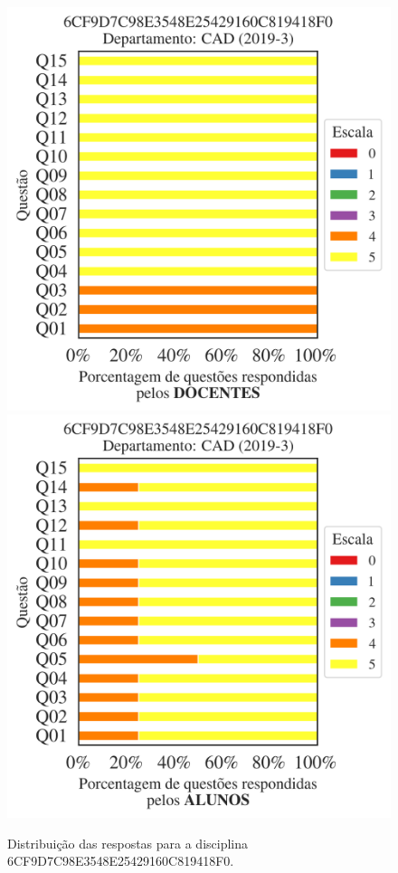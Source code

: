 \documentclass[a4paper,10pt]{article}
\begin{document}
\begin{figure}[h]
\centering
\includegraphics[width=0.485\linewidth]{analise_disciplina_departamento_CAD_6CF9D7C98E3548E25429160C819418F0_docentes.png}
\includegraphics[width=0.485\linewidth]{analise_disciplina_departamento_CAD_6CF9D7C98E3548E25429160C819418F0_alunos.png}
\caption{\label{fig:analise_geral_departamento}                Distribuição das respostas para a disciplina 6CF9D7C98E3548E25429160C819418F0. }
\end{figure}
\end{document}
